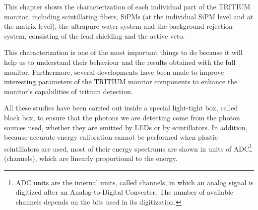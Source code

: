 This chapter shows the characterization of each individual part of the TRITIUM monitor, including scintillating fibers, SiPMs (at the individual SiPM level and at the matrix level), the ultrapure water system and the background rejection system, consisting of the lead shielding and the active veto. 

This characterization is one of the most important things to do because it will help us to understand their behaviour and the results obtained with the full monitor. Furthermore, several developments have been made  to improve interesting parameters of the TRITIUM monitor components to enhance the monitor's capabilities of tritium detection.

All these studies have been carried out inside a special light-tight box, called black box, to ensure that the photons we are detecting come from the photon sources used, whether they are emitted by LEDs or by scintillators. In addition, because accurate energy calibration cannot be performed when plastic scintillators are used, most of their energy spectrums are shown in units of ADC\footnote{ADC units are the internal units, called channels, in which an analog signal is digitized after an Analog-to-Digital Converter. The number of available channels depends on the bits used in its digitization.} (channels), which are linearly proportional to the energy.